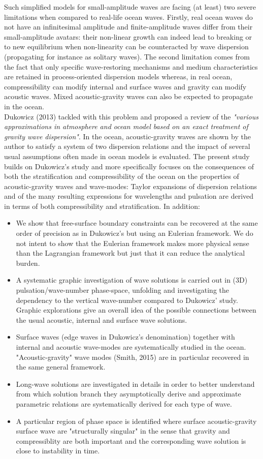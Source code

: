 \documentclass[a4paper,11pt]{article}
\begin{document}
Such simplified models for small-amplitude waves are facing (at least) two severe limitations when compared to real-life ocean waves. Firstly, real ocean waves do not have an infinitesimal amplitude and finite-amplitude waves differ from their small-amplitude avatars: their non-linear growth can indeed lead to breaking or to new equilibrium when non-linearity can be counteracted by wave dispersion (propagating for instance as solitary waves). The second limitation comes from the fact that only specific wave-restoring mechanisms and medium characteristics are retained in process-oriented dispersion models whereas, in real ocean, compressibility can modify internal and surface waves and gravity can modify acoustic waves. Mixed acoustic-gravity waves can also be expected to propagate in the ocean.\\
Dukowicz (2013) tackled with this problem and proposed a review of the \textit{"various approximations in atmosphere and ocean model based on an exact treatment of gravity wave dispersion"}. In the ocean, acoustic-gravity waves are shown by the author to satisfy a system of two dispersion relations and the impact of several usual assumptions often made in ocean models is evaluated. The present study builds on Dukowicz's study and more specifically focuses on the consequences of both the stratification and compressibility of the ocean on the properties of acoustic-gravity waves and wave-modes: Taylor expansions of dispersion relations and of the many resulting expressions for wavelengths and pulsation are derived in terms of both compressibility and stratification. In addition:
\begin{itemize}
	\item We show that free-surface boundary constraints can be recovered at the same order of precision as in Dukowicz's but using an Eulerian framework. We do not intent to show that the Eulerian framework makes more physical sense than the Lagrangian framework but just that it can reduce the analytical burden.
	\item A systematic graphic investigation of wave solutions is carried out in (3D) pulsation/wave-number phase-space, unfolding and investigating the dependency to the vertical wave-number compared to Dukowicz' study. Graphic explorations give an overall idea of the possible connections between the usual acoustic, internal and surface wave solutions.
	\item Surface waves (edge waves in Dukowicz's denomination) together with internal and acoustic wave-modes are systematically studied in the ocean. "Acoustic-gravity" wave modes (Smith, 2015) are in particular recovered in the same general framework. 
	\item Long-wave solutions are investigated in details in order to better understand from which solution branch they asymptotically derive and approximate parametric relations are systematically derived for each type of wave.
	\item A particular region of phase space is identified where surface acoustic-gravity surface wave are "structurally singular" in the sense that gravity and compressiblity are both important and the corresponding wave solution is close to instability in time.
\end{itemize}   
\end{document}
